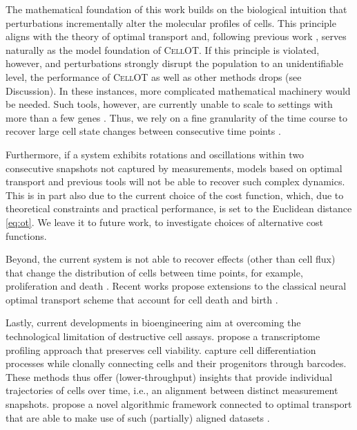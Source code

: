The mathematical foundation of this work builds on the biological intuition that perturbations incrementally alter the molecular profiles of cells. This principle aligns with the theory of optimal transport and, following previous work \citep{schiebinger2019optimal}, serves naturally as the model foundation of \textsc{CellOT}.
If this principle is violated, however, and perturbations strongly disrupt the population to an unidentifiable level, the performance of \textsc{CellOT} as well as other methods drops (see Discussion).
In these instances, more complicated mathematical machinery would be needed.
Such tools, however, are currently unable to scale to settings with more than a few genes \citep{heydari2022iqcell}.
Thus, we rely on a fine granularity of the time course to recover large cell state changes between consecutive time points \citep{tritschler2019concepts}.

Furthermore, if a system exhibits rotations and oscillations within two consecutive snapshots not captured by measurements, models based on optimal transport and previous tools \citep{weinreb2018fundamental} will not be able to recover such complex dynamics. This is in part also due to the current choice of the cost function, which, due to theoretical constraints and practical performance, is set to the Euclidean distance \eqref{eq:ot}. We leave it to future work, to investigate choices of alternative cost functions. 

Beyond, the current system is not able to recover effects (other than cell flux) that change the distribution of cells between time points, for example, proliferation and death \citep{tritschler2019concepts}. Recent works propose extensions to the classical neural optimal transport scheme that account for cell death and birth \citep{lubeck2022neural}.

Lastly, current developments in bioengineering aim at overcoming the technological limitation of destructive cell assays. \citet{chen2022live} propose a transcriptome profiling approach that preserves cell viability. \citet{weinreb2020lineage} capture cell differentiation processes while clonally connecting cells and their progenitors through barcodes. These methods thus offer (lower-throughput) insights that provide individual trajectories of cells over time, i.e., an alignment between distinct measurement snapshots.
\citet{somnath2023aligned} propose a novel algorithmic framework connected to optimal transport that are able to make use of such (partially) aligned datasets \citep{shi2023diffusion, tong2023conditional}. 
